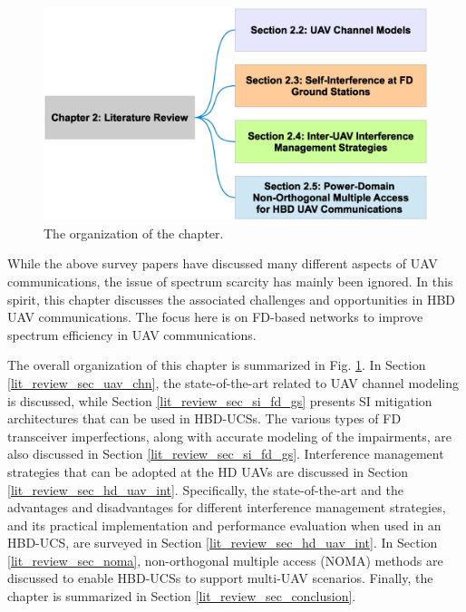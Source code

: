 \begin{figure} [tpb]
\centering
\includegraphics [width=0.8\columnwidth]{chap2_fig/taxonomy.eps} 
\vspace{-1cm}
\caption{The organization of the chapter.}
\label{fig:lit_review_taxonomy}
\end{figure}

While the above survey papers have discussed many different aspects of UAV communications, the issue of spectrum scarcity has mainly been ignored. In this spirit, this chapter discusses the associated challenges and opportunities in HBD UAV communications. The focus here is on FD-based networks to improve spectrum efficiency in UAV communications. 

The overall organization of this chapter is summarized in Fig. \ref{fig:lit_review_taxonomy}. In Section \ref{lit_review_sec_uav_chn}, the state-of-the-art related to UAV channel modeling is discussed, while Section \ref{lit_review_sec_si_fd_gs} presents SI mitigation architectures that can be used in HBD-UCSs. The various types of FD transceiver imperfections, along with accurate modeling of the impairments, are also discussed in Section \ref{lit_review_sec_si_fd_gs}. Interference management strategies that can be adopted at the HD UAVs are discussed in Section \ref{lit_review_sec_hd_uav_int}. Specifically, the state-of-the-art and the advantages and disadvantages for different interference management strategies, and its practical implementation and performance evaluation when used in an HBD-UCS, are surveyed in Section \ref{lit_review_sec_hd_uav_int}. In Section \ref{lit_review_sec_noma}, non-orthogonal multiple access (NOMA) methods are discussed to enable HBD-UCSs to support multi-UAV scenarios. Finally, the chapter is summarized in Section \ref{lit_review_sec_conclusion}.


